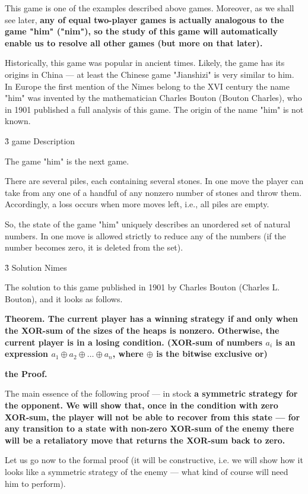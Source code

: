 This game is one of the examples described above games. Moreover, as we shall see later, \bf{any} of equal two-player games is actually analogous to the game "him" ("nim"), so the study of this game will automatically enable us to resolve all other games (but more on that later).

Historically, this game was popular in ancient times. Likely, the game has its origins in China --- at least the Chinese game "Jianshizi" is very similar to him. In Europe the first mention of the Nimes belong to the XVI century the name "him" was invented by the mathematician Charles Bouton (Bouton Charles), who in 1901 published a full analysis of this game. The origin of the name "him" is not known.


\h3{ game Description }

The game "him" is the next game.

There are several piles, each containing several stones. In one move the player can take from any one of a handful of any nonzero number of stones and throw them. Accordingly, a loss occurs when more moves left, i.e., all piles are empty.

So, the state of the game "him" uniquely describes an unordered set of natural numbers. In one move is allowed strictly to reduce any of the numbers (if the number becomes zero, it is deleted from the set).


\h3{ Solution Nimes }

The solution to this game published in 1901 by Charles Bouton (Charles L. Bouton), and it looks as follows.

\bf{Theorem}. The current player has a winning strategy if and only when the XOR-sum of the sizes of the heaps is nonzero. Otherwise, the current player is in a losing condition. (XOR-sum of numbers $a_i$ is an expression $a_1 \oplus a_2 \oplus \ldots \oplus a_n$, where $\oplus$ is the bitwise exclusive or)

\bf{the Proof}.

The main essence of the following proof --- in stock \bf{a symmetric strategy for the opponent}. We will show that, once in the condition with zero XOR-sum, the player will not be able to recover from this state --- for any transition to a state with non-zero XOR-sum of the enemy there will be a retaliatory move that returns the XOR-sum back to zero.

Let us go now to the formal proof (it will be constructive, i.e. we will show how it looks like a symmetric strategy of the enemy --- what kind of course will need him to perform).

